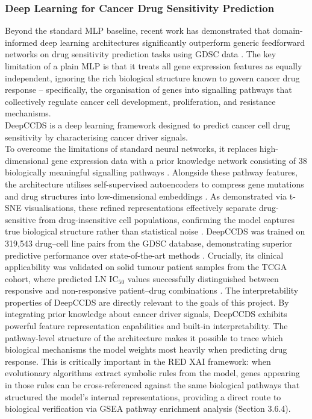 \subsubsection{Deep Learning for Cancer Drug Sensitivity Prediction}
Beyond the standard MLP baseline, recent work has demonstrated that domain-informed deep learning architectures 
significantly outperform generic feedforward networks on drug sensitivity prediction tasks using GDSC data 
\cite{Partin2023,Wu2025}. The key limitation of a plain MLP is that it treats all gene expression 
features as equally independent, ignoring the rich biological structure known to govern cancer drug response – 
specifically, the organisation of genes into signalling pathways that collectively regulate cancer cell 
development, proliferation, and resistance mechanisms.
\\
DeepCCDS \cite{Wu2025} is a deep learning framework designed to predict cancer cell drug sensitivity by 
characterising cancer driver signals.
\\
To overcome the limitations of standard neural networks, it replaces high-dimensional gene expression data with 
a prior knowledge network consisting of 38 biologically meaningful signalling pathways \cite{Wu2025} . 
Alongside these pathway features, the architecture utilises self-supervised autoencoders to compress gene 
mutations and drug structures into low-dimensional embeddings . As demonstrated via t-SNE visualisations, 
these refined representations effectively separate drug-sensitive from drug-insensitive cell populations, 
confirming the model captures true biological structure rather than statistical noise \cite{Wu2025}. 
DeepCCDS was trained on 319,543 drug–cell line pairs from the GDSC database, demonstrating superior predictive 
performance over state-of-the-art methods \cite{Wu2025}. Crucially, its clinical applicability was 
validated on solid tumour patient samples from the TCGA cohort, where predicted LN IC$_{50}$ values successfully 
distinguished between responsive and non-responsive patient–drug combinations \cite{Wu2025}.
The interpretability properties of DeepCCDS are directly relevant to the goals of this project. By integrating 
prior knowledge about cancer driver signals, DeepCCDS exhibits powerful feature representation capabilities and 
built-in interpretability. The pathway-level structure of the architecture makes it possible to trace which 
biological mechanisms the model weights most heavily when predicting drug response. This is critically 
important in the RED XAI framework: when evolutionary algorithms extract symbolic rules from the model, 
genes appearing in those rules can be cross-referenced against the same biological pathways that structured 
the model's internal representations, providing a direct route to biological verification via GSEA pathway 
enrichment analysis (Section 3.6.4).


